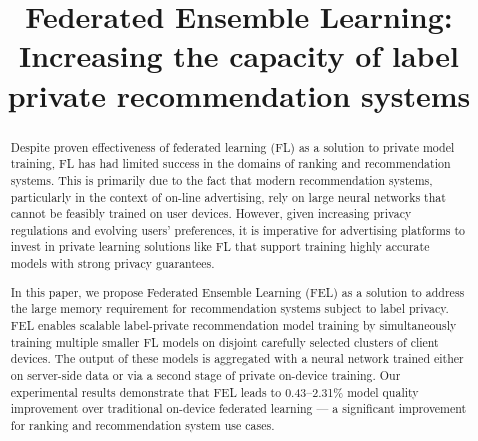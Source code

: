 \documentclass{article}
\title{Federated Ensemble Learning: Increasing the capacity of label private recommendation systems}
\begin{document}
\maketitle
\begin{abstract}
\vspace{-0.25cm}
Despite proven effectiveness of federated learning (FL) as a solution to private model training, FL has had limited success in the domains of ranking and recommendation systems. This is primarily due to the fact that modern recommendation systems, particularly in the context of on-line advertising, rely on large neural networks that cannot be feasibly trained on user devices.
However, given increasing privacy regulations and evolving users' preferences, it is imperative for advertising platforms to invest in private learning solutions like FL that support training highly accurate models with strong privacy guarantees.

In this paper, we propose Federated Ensemble Learning (FEL) as a solution to address the large memory requirement for recommendation systems subject to label privacy. FEL enables scalable label-private recommendation model training by simultaneously training multiple smaller FL models on disjoint carefully selected clusters of client devices. The output of these models is aggregated with a neural network trained  either on server-side data or via a second stage of private on-device training. Our experimental results demonstrate that FEL leads to 0.43--2.31\% model quality improvement over traditional on-device federated learning --- a significant improvement for ranking and recommendation system use cases.



\end{abstract}
\end{document}
